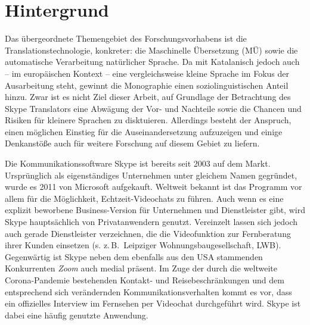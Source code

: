
\section{Hintergrund}
\label{K1:sec:Hintergrund}\largerpage


Das übergeordnete Themengebiet des Forschungsvorhabens ist die Translationstechnologie, konkreter: die Maschinelle Übersetzung (MÜ) sowie die automatische Verarbeitung natürlicher Sprache. Da mit Katalanisch jedoch auch -- im europäischen Kontext -- eine vergleichsweise \glqq kleine\grqq{} Sprache im Fokus der Ausarbeitung steht, gewinnt die Monographie einen soziolinguistischen Anteil hinzu. Zwar ist es nicht Ziel dieser Arbeit, auf Grundlage der Betrachtung des Skype Translators eine Abwägung der Vor- und Nachteile sowie die Chancen und Risiken für kleinere Sprachen zu disktuieren. Allerdings besteht der Anspruch, einen möglichen Einstieg für die Auseinandersetzung aufzuzeigen und einige Denkanstöße auch für weitere Forschung auf diesem Gebiet zu liefern.

Die Kommunikationssoftware Skype ist bereits seit 2003 auf dem Markt. Ursprünglich als eigenständiges Unternehmen unter gleichem Namen gegründet, wurde es 2011 von Microsoft aufgekauft. Weltweit bekannt ist das Programm vor allem für die Möglichkeit, Echtzeit-Videochats zu führen. Auch wenn es eine explizit beworbene Business-Version für Unternehmen und Dienstleister gibt, wird Skype hauptsächlich von Privatanwendern genutzt. Vereinzelt lassen sich jedoch auch gerade Dienstleister verzeichnen, die die Videofunktion zur Fernberatung ihrer Kunden einsetzen (s. z.\,B.\ Leipziger Wohnungsbaugesellschaft, LWB). Gegenwärtig ist Skype neben dem ebenfalls aus den USA stammenden Konkurrenten \emph{Zoom} auch medial präsent. Im Zuge der durch die weltweite Corona-Pandemie bestehenden Kontakt- und Reisebeschränkungen und dem entsprechend sich verändernden Kommunikationsverhalten kommt es vor, dass ein offizielles Interview im Fernsehen per Videochat durchgeführt wird. Skype ist dabei eine häufig genutzte Anwendung.

